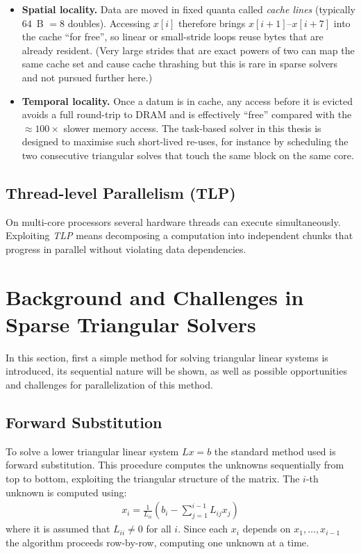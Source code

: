 \begin{itemize}
\item \textbf{Spatial locality.}  
      Data are moved in fixed quanta called \emph{cache lines}
      (typically $64$~B $=8$ doubles).
      Accessing $x[i]$ therefore brings $x[i+1]$–$x[i+7]$ into the
      cache “for free”, so linear or small-stride loops reuse bytes
      that are already resident.
      (Very large strides that are exact powers of two can map the same
      cache set and cause cache thrashing but this is rare in sparse
      solvers and not pursued further here.)

\item \textbf{Temporal locality.}  
      Once a datum is in cache, any access before it is evicted avoids a
      full round-trip to DRAM and is effectively “free” compared with the
      $\approx 100 \times$ slower memory access.  The task-based solver in this thesis
      is designed to maximise such short-lived re-uses, for instance by
      scheduling the two consecutive triangular solves that touch the
      same block on the same core.
\end{itemize}

\subsection{Thread-level Parallelism (TLP)}
On multi-core processors several hardware threads can execute
simultaneously.
Exploiting \emph{TLP} means decomposing a computation into independent
chunks that progress in parallel without violating data dependencies.

\section{Background and Challenges in Sparse Triangular Solvers}
\label{chap:lr_challenges}
In this section, first a simple method for solving triangular linear systems is introduced, its sequential nature will be shown, as well as possible opportunities and challenges for parallelization of this method.

\subsection{Forward Substitution}
To solve a lower triangular linear system $Lx=b$ the standard method used is forward substitution. This procedure computes the unknowns sequentially from top to bottom, exploiting the triangular structure of the matrix. The $i$-th unknown is computed using:
\begin{align}
    x_i = \frac{1}{L_{ii}} \left( b_i - \sum_{j=1}^{i-1} L_{ij} x_j \right)
\end{align} 
where it is assumed that $L_{ii} \neq 0$ for all $i$. Since each $x_i$ depends on $x_1, \dots, x_{i-1}$ the algorithm proceeds row-by-row, computing one unknown at a time.

